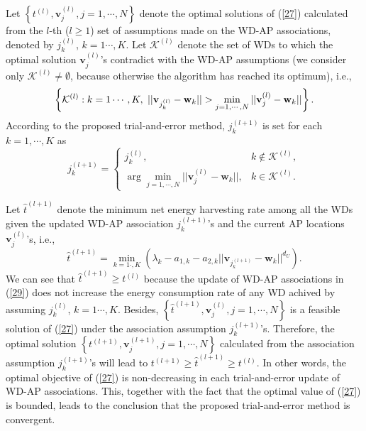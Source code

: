 \documentclass[journal, draftcls, one column, 12pt]{IEEEtran}
\begin{document}
 \label{59}
Let $\left\{t^{(l)},\mathbf{v}_j^{(l)},j=1,\cdots,N\right\}$ denote the optimal solutions of (\ref{27}) calculated from the $l$-th ($l\geq 1$) set of assumptions made on the WD-AP associations, denoted by $j_k^{(l)}$, $k=1\cdots,K$. Let $\mathcal{K}^{(l)}$ denote the set of WDs to which the optimal solution $\mathbf{v}_j^{(l)}$'s contradict with the WD-AP assumptions (we consider only $\mathcal{K}^{(l)}\neq \emptyset$, because otherwise the algorithm has reached its optimum), i.e.,
\begin{equation}
\small
\left\{\mathcal{K}^{(l)}: k=1\cdots,K, \ ||\mathbf{v}_{j_k^{(l)}}-\mathbf{w}_k|| > \min_{j=1,\cdots,N} ||\mathbf{v}_{j}^{(l)}- \mathbf{w}_k|| \right\}.
\end{equation}
According to the proposed trial-and-error method, $j_k^{(l+1)}$ is set for each $k=1,\cdots,K$ as
\begin{equation}
\label{29}
j_k^{(l+1)} =
\begin{cases}
j_k^{(l)}, & k\notin \mathcal{K}^{(l)},\\
\arg \min_{j=1,\cdots,N} ||\mathbf{v}_{j}^{(l)}- \mathbf{w}_k||, & k \in \mathcal{K}^{(l)}.
\end{cases}
\end{equation}

Let $\hat{t}^{(l+1)}$ denote the minimum net energy harvesting rate among all the WDs given the updated WD-AP association $j_k^{(l+1)}$'s and the current AP locations $\mathbf{v}_j^{(l)}$'s, i.e.,
\begin{equation}
\hat{t}^{(l+1)} = \min_{k=1\cdot,K} \left(\lambda_k - a_{1,k}- a_{2,k} ||\mathbf{v}_{j_k^{(l+1)}} - \mathbf{w}_k||^{d_U}\right).
\end{equation}
We can see that $\hat{t}^{(l+1)} \geq t^{(l)}$ because the update of WD-AP associations in (\ref{29}) does not increase the energy consumption rate of any WD achived by assuming $j_k^{(l)}$, $k=1\cdots,K$. Besides, $\left\{\hat{t}^{(l+1)}, \mathbf{v}_j^{(l)},j=1,\cdots,N\right\}$ is a feasible solution of (\ref{27}) under the association assumption $j_k^{(l+1)}$'s. Therefore, the optimal solution $\left\{t^{(l+1)},\mathbf{v}_j^{(l+1)},j=1,\cdots,N\right\}$ calculated from the association assumption $j_k^{(l+1)}$'s will lead to $t^{(l+1)}\geq  \hat{t}^{(l+1)} \geq t^{(l)}$. In other words, the optimal objective of (\ref{27}) is non-decreasing in each trial-and-error update of WD-AP associations. This, together with the fact that the optimal value of (\ref{27}) is bounded, leads to the conclusion that the proposed trial-and-error method is convergent.
\end{document}
